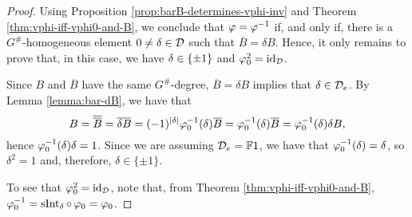 \begin{proof}
	Using Proposition \ref{prop:barB-determines-vphi-inv} and Theorem \ref{thm:vphi-iff-vphi0-and-B}, we conclude that $\varphi = \varphi^{-1}$ if, and only if, there is a $G^\#$-homogeneous element $0 \neq \delta \in \mathcal{D}$ such that $\overline {B} = \delta B$. 
	Hence, it only remains to prove that, in this case, we have $\delta \in \{ \pm 1 \}$ and $\varphi_0^2 = \operatorname{id}_{\mathcal{D}}$. 
	
	Since $B$ and $\overline {B}$ have the same $G^\#$-degree, $\overline {B} = \delta B$ implies that $\delta \in \mathcal{D}_e$. 
	By Lemma \ref{lemma:bar-dB}, we have that
	\[
		B = \overline {\overline B} = \overline {\delta B} = (-1)^{|\delta|} \varphi_0^{-1}(\delta) \overline B= \varphi_0^{-1}(\delta) \overline B = \varphi_0^{-1}(\delta) \delta B,
	\]
	hence $\varphi_0^{-1}(\delta) \delta = 1$. 
	Since we are assuming $\mathcal{D}_e = \mathbb{F} 1$, we have that $\varphi_0^{-1}(\delta) = \delta$, so $\delta^2 = 1$ and, therefore, $\delta \in \{ \pm 1 \}$. 

	To see that $\varphi_0^ 2 = \operatorname{id}_{\mathcal{D}}$, note that, from Theorem \ref{thm:vphi-iff-vphi0-and-B}, $\varphi_0^{-1} = \operatorname{sInt}_\delta \circ \,\varphi_0 = \varphi_0$. 
\end{proof}